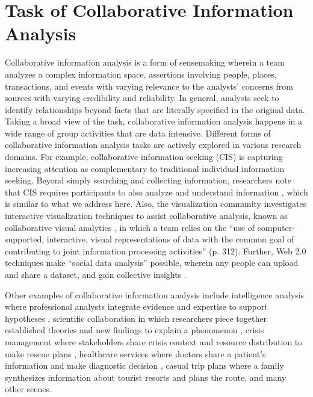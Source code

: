 \section{Task of Collaborative Information Analysis}

Collaborative information analysis is a form of sensemaking wherein a team
analyzes a complex information space, assertions involving people, places,
transactions, and events with varying relevance to the analysts’ concerns from
sources with varying credibility and reliability. In general,
analysts seek to identify relationships beyond facts that are literally specified in the original data. Taking a broad view of the task, collaborative information analysis happens in a wide range of group activities that are data intensive. Different forms of collaborative information analysis tasks
are actively explored in various research domains. For example, collaborative
information seeking (CIS) \citep{Shah2014i} is capturing increasing attention as
complementary to traditional individual information seeking. Beyond simply
searching and collecting information, researchers note that CIS requires
participants to also analyze and understand information \citep{Paul2010}, which is similar to what we address here. Also, the visualization
community investigates interactive visualization techniques to assist collaborative
analysis, known as collaborative visual analytics \citep{Isenberg2011}, in which a team relies on the
``use of computer-supported, interactive, visual representations of data with
the common goal of contributing to joint information processing activities''
(p. 312). Further, Web 2.0 techniques make ``social data
analysis'' possible, wherein any people can upload and share a dataset, and gain
collective insights \citep{Morton2014}.

Other examples of collaborative information analysis include
intelligence analysis where professional analysts integrate evidence and
expertise to support hypotheses \citep{Heuer1999}, scientific collaboration in
which researchers piece together established theories and new findings to
explain a phenomenon \citep{Farooq2009}, crisis management
where stakeholders share crisis context and resource distribution to make rescue
plans \citep{Tomaszewski2012b, Convertino2011}, healthcare services where doctors share
a patient’s information and make diagnostic decision \citep{Reddy2008c}, casual
trip plans where a family synthesizes information about tourist resorts and plans
the route, and many other scenes. 

